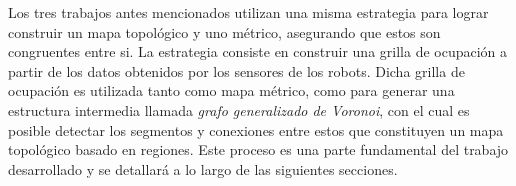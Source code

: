 Los tres trabajos antes mencionados utilizan una misma estrategia para lograr construir un mapa topológico y uno métrico, asegurando que estos son congruentes entre si. La estrategia consiste en construir una grilla de ocupación a partir de los datos obtenidos por los sensores de los robots. Dicha grilla de ocupación es utilizada tanto como mapa métrico, como para generar una estructura intermedia llamada \emph{grafo generalizado de Voronoi}, con el cual es posible detectar los segmentos y conexiones entre estos que constituyen  un mapa topológico basado en regiones. Este proceso es una parte fundamental del trabajo desarrollado y se detallará a lo largo de las siguientes secciones.

% 





